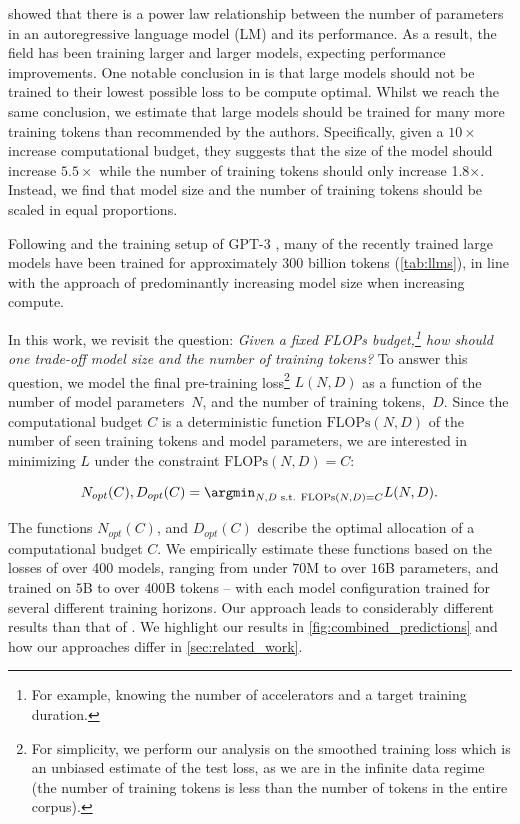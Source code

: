 \citet{kaplan2020scaling} showed that there is a power law relationship between the number of parameters in an autoregressive language model (LM) and its performance. As a result, the field has been training larger and larger models, expecting performance improvements. One notable conclusion in \citet{kaplan2020scaling} is that large models should not be trained to their lowest possible loss to be compute optimal. Whilst we reach the same conclusion, we estimate that large models should be trained for many more training tokens than recommended by the authors. Specifically, given a $10\times$ increase computational budget, they suggests that the size of the model should increase $5.5\times$ while the number of training tokens should only increase 1.8$\times$.
Instead, we find that model size and the number of training tokens should be scaled in equal proportions.

Following \citet{kaplan2020scaling} and the training setup of GPT-3 \citep{gpt3}, many of the recently trained large models have been trained for approximately 300 billion tokens (\autoref{tab:llms}), in line with the approach of predominantly increasing model size when increasing compute.

In this work, we revisit the question:
\textit{Given a fixed FLOPs budget,\footnote{For example, knowing the number of accelerators and a target training duration.} how should one trade-off model size and the number of training tokens?} To answer this question, we model the final pre-training loss\footnote{
For simplicity, we perform our analysis on the smoothed training loss which is an unbiased estimate of the test loss, as we are in the infinite data regime (the number of training tokens is less than the number of tokens in the entire corpus).} $L(N, D)$ as a function of the number of model parameters~$N$, and the number of training tokens,~$D$. Since the computational budget $C$ is a deterministic function $\text{FLOPs}(N,D)$ of the number of seen training tokens and model parameters, we are interested in minimizing $L$ under the constraint $\text{FLOPs}(N, D) = C$:

\begin{equation}\label{eq:model}
    N_{opt}(C), D_{opt}(C) = \argmin_{N, D \text{ s.t. } \text{FLOPs}(N, D) = C} L(N, D).
\end{equation}

The functions $N_{opt}(C)$, and $D_{opt}(C)$ describe the optimal allocation of a computational budget $C$. We empirically estimate these functions based on the losses of over 400  models, ranging from under $70$M to over $16$B parameters, and trained on $5$B to over $400$B tokens -- with each model configuration trained for several different training horizons. Our approach leads to considerably different results than that of \citet{kaplan2020scaling}.
We highlight our results in \autoref{fig:combined_predictions} and how our approaches differ in \autoref{sec:related_work}.

